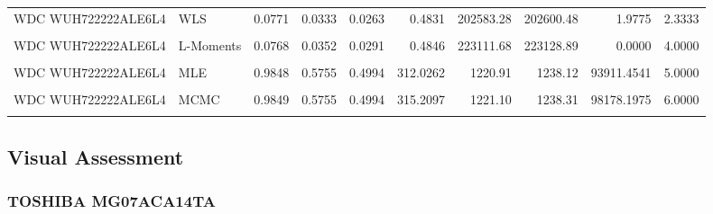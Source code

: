 \documentclass[
]{article}
\begin{document}
\begin{longtable}[t]{llrrrrrrrr}
WDC WUH722222ALE6L4 & WLS & 0.0771 & 0.0333 & 0.0263 & 0.4831 & 202583.28 & 202600.48 & 1.9775 & 2.3333\\
\addlinespace
\cellcolor{gray!10}{WDC WUH722222ALE6L4} & \cellcolor{gray!10}{MOM} & \cellcolor{gray!10}{0.0867} & \cellcolor{gray!10}{0.0375} & \cellcolor{gray!10}{0.0307} & \cellcolor{gray!10}{0.5275} & \cellcolor{gray!10}{230700.18} & \cellcolor{gray!10}{230717.39} & \cellcolor{gray!10}{0.0000} & \cellcolor{gray!10}{5.3333}\\
WDC WUH722222ALE6L4 & L-Moments & 0.0768 & 0.0352 & 0.0291 & 0.4846 & 223111.68 & 223128.89 & 0.0000 & 4.0000\\
\cellcolor{gray!10}{WDC WUH722222ALE6L4} & \cellcolor{gray!10}{EPF} & \cellcolor{gray!10}{0.0976} & \cellcolor{gray!10}{0.0412} & \cellcolor{gray!10}{0.0336} & \cellcolor{gray!10}{0.6171} & \cellcolor{gray!10}{239868.14} & \cellcolor{gray!10}{239885.34} & \cellcolor{gray!10}{0.0000} & \cellcolor{gray!10}{6.3333}\\
WDC WUH722222ALE6L4 & MLE & 0.9848 & 0.5755 & 0.4994 & 312.0262 & 1220.91 & 1238.12 & 93911.4541 & 5.0000\\
\cellcolor{gray!10}{WDC WUH722222ALE6L4} & \cellcolor{gray!10}{MAP} & \cellcolor{gray!10}{0.9845} & \cellcolor{gray!10}{0.5756} & \cellcolor{gray!10}{0.4996} & \cellcolor{gray!10}{340.4928} & \cellcolor{gray!10}{1271.91} & \cellcolor{gray!10}{1289.12} & \cellcolor{gray!10}{2276.5954} & \cellcolor{gray!10}{7.0000}\\
\addlinespace
WDC WUH722222ALE6L4 & MCMC & 0.9849 & 0.5755 & 0.4994 & 315.2097 & 1221.10 & 1238.31 & 98178.1975 & 6.0000\\
\cellcolor{gray!10}{WDC WUH722222ALE6L4} & \cellcolor{gray!10}{Percentile} & \cellcolor{gray!10}{0.1392} & \cellcolor{gray!10}{0.0605} & \cellcolor{gray!10}{0.0458} & \cellcolor{gray!10}{1.0983} & \cellcolor{gray!10}{220752.17} & \cellcolor{gray!10}{220769.37} & \cellcolor{gray!10}{7.2683} & \cellcolor{gray!10}{6.0000}\\*
\end{longtable}
\endgroup{}

\subsection{Visual Assessment}\label{visual-assessment}

\subsubsection{TOSHIBA MG07ACA14TA}\label{toshiba-mg07aca14ta-1}
\end{document}
